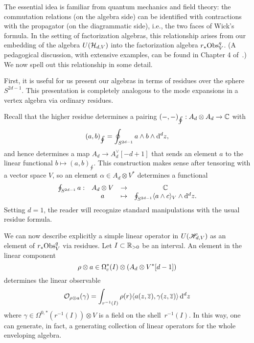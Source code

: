 
The essential idea is familiar from quantum mechanics and field theory:
the commutation relations (on the algebra side) can be identified with contractions with the propagator (on the diagrammatic side),
i.e., the two faces of Wick's formula.
In the setting of factorization algebras,
this relationship arises from our embedding of the algebra $U(\mathcal H_{d,V})$ into the factorization algebra $r_* {\rm Obs}^q_V$.
(A pedagogical discussion, with extensive examples, can be found in Chapter 4 of~\cite{CG}.)
We now spell out this relationship in some detail.

First, it is useful for us present our algebras in terms of residues over the sphere $S^{2d-1}$. 
This presentation is completely analogous to the mode expansions in a vertex algebra via ordinary residues.

Recall that the higher residue determines a pairing $(-,-)_{\oint}: A_d \otimes A_d \to   \mathbb C$ with
\[
(a, b)_{\oint} = \oint_{S^{2d-1}} a \wedge b \wedge {\rm d}^d z ,
\]
and hence determines a map $A_d \to A_d^\vee [-d + 1]$ that sends an element $a$ to the linear functional $b \mapsto (a, b)_{\oint}$.
This construction makes sense after tensoring with a vector space $V$,
so an element $\alpha \in A_d \otimes V^*$ determines a functional 
\[
\begin{array}{cccc}
\oint_{S^{2d-1}} a  : & A_d \otimes V & \to & \mathbb C \\
& a & \mapsto & \oint_{S^{2d-1}} \langle a \wedge c\rangle_V \wedge {\rm d}^d z .
\end{array}
\]
Setting $d=1$, the reader will recognize standard manipulations with the usual residue formula.

We can now describe explicitly a simple linear operator in $U(\mathscr H_{d,V})$ as an element of $r_* {\rm Obs}^q_V$ via residues.   
Let $I \subset \mathbb R_{>0}$ be an interval. 
An element in the linear component 
\[
\rho \otimes a \in \Omega^*_c(I) \otimes \left(A_d \otimes V^*[d-1]\right)
\] 
determines the linear observable 
\[
\mathcal O_{\rho \otimes a}(\gamma) = \int_{r^{-1}(I)} \rho(r) \langle a(z,\overline{z}), \gamma(z,\overline{z})\rangle \,{\rm d}^d z 
\] 
where $\gamma \in \Omega^{0,*}(r^{-1}(I)) \otimes V$ is a field on the shell~$r^{-1}(I)$.
In this way, one can generate, in fact, a generating collection of linear operators for the whole enveloping algebra.

